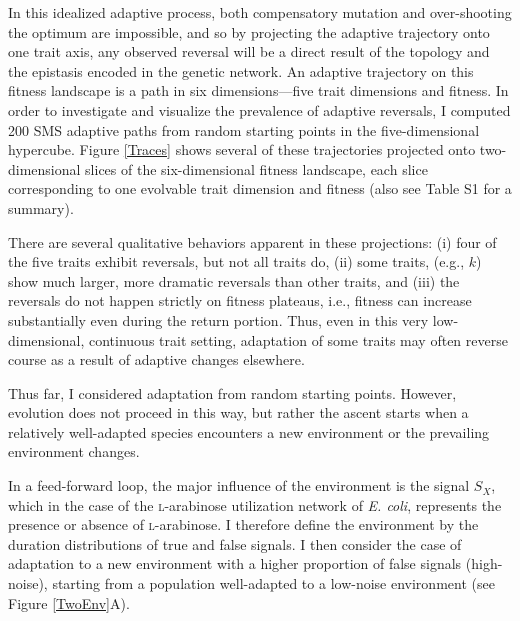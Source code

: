 \documentclass[dvips,12pt,twoside,titlepage]{article}
\begin{document}
In this idealized adaptive process, both compensatory mutation and over-shooting the optimum are impossible, and so by projecting the adaptive trajectory onto one trait axis, any observed reversal will be a direct result of the topology and the epistasis encoded in the genetic network. 
An adaptive trajectory on this fitness landscape is a path in six dimensions---five trait dimensions and fitness. 
In order to investigate and visualize the prevalence of adaptive reversals, I computed 200 SMS adaptive paths from random starting points in the five-dimensional hypercube. Figure \ref{Traces} shows several of these trajectories projected onto two-dimensional slices of the six-dimensional fitness landscape, each slice corresponding to one evolvable trait dimension and fitness (also see Table S1 for a summary). 

There are several qualitative behaviors apparent in these projections:
(i) four of the five traits exhibit reversals, but not all traits do, 
(ii) some traits, (e.g., $k$) show much larger, more dramatic reversals than other traits, and
(iii) the reversals do not happen strictly on fitness plateaus, i.e., fitness can increase substantially even during the return portion.
Thus, even in this very low-dimensional, continuous trait setting, adaptation of some traits may often reverse course as a result of adaptive changes elsewhere.

Thus far, I considered adaptation from random starting points. However, evolution does not proceed in this way, but rather the ascent starts when a relatively well-adapted species encounters a new environment or the prevailing environment changes.

In a feed-forward loop, the major influence of the environment is the signal $S_X$, which in the case of the \textsc{l}-arabinose utilization network of \emph{E. coli}, represents the presence or absence of \textsc{l}-arabinose. I therefore define the environment by the duration distributions of true and false signals. I then consider the case of adaptation to a new environment with a higher proportion of false signals (high-noise), starting from a population well-adapted to a low-noise environment (see Figure \ref{TwoEnv}A). 
\end{document}
